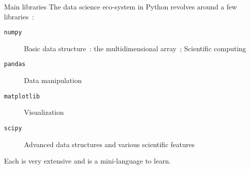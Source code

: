 \begin{frame}{Main libraries}
  The data science eco-system in Python revolves around a few libraries~:
  \begin{description}
    \item[\texttt{numpy}] Basic data structure~: the multidimensional array~; Scientific computing
    \item[\texttt{pandas}] Data manipulation
    \item[\texttt{matplotlib}] Visualization
    \item[\texttt{scipy}] Advanced data structures and various scientific features
  \end{description}
  Each is very extensive and is a mini-language to learn.
\end{frame}
